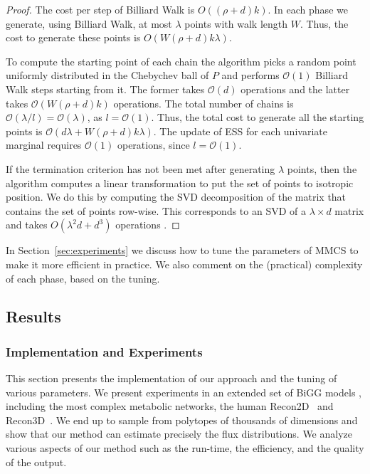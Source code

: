    \begin{proof}
       The cost per step of Billiard Walk is $O((\rho + d)k)$. In each phase we
       generate, using Billiard Walk, at most $\lambda$ points with walk length $W$.
       Thus, the cost to generate these points is $O(W(\rho + d)k\lambda)$.
     
        To compute the starting point of each chain the algorithm picks a random point
        uniformly distributed in the Chebychev ball of $P$ and performs $\mathcal{O}(1)$
        Billiard Walk steps starting from it.
        The former  takes $\mathcal{O}(d)$ operations and the latter  takes $\mathcal{O}(W(\rho + d)k)$ operations.
        The total number of chains is 
        $\mathcal{O}(\lambda / l) = \mathcal{O}(\lambda)$, 
        as $l=\mathcal{O}(1)$.
        Thus, the total cost to generate all the starting points is 
        $\mathcal{O}(d\lambda + W(\rho + d)k\lambda)$. 
        The update of ESS for each univariate marginal requires $\mathcal{O}(1)$ operations, 
        since $l = \mathcal{O}(1)$.
     
        If the termination criterion has not been met after generating $\lambda$ points,
        then the algorithm computes a linear transformation to put the set of points to isotropic position. 
        We do this by computing the SVD decomposition of the matrix that
        contains the set of points row-wise. This corresponds to an SVD of a
        $\lambda \times d$ matrix and takes $O(\lambda^2d + d^3)$ operations
        \citep{golub13}.
   \end{proof}

   In Section~\ref{sec:experiments} we discuss how to tune the parameters of MMCS
   to make it more efficient in practice. We also comment on the (practical)
   complexity of each phase, based on the tuning.



\subsection{Results}
\subsubsection*{Implementation and Experiments}
\label{sec:experiments}

   This section presents the implementation of our approach and the tuning of various parameters. 
   We present experiments in an extended set of BiGG models \citep{king2016bigg}, including the most complex metabolic networks, the human Recon2D~\citep{swainston16} and Recon3D~\citep{brunk2018recon3d}. 
   We end up to sample from polytopes of thousands of dimensions and show that our method can estimate precisely the flux distributions. 
   We analyze various aspects of our method such as the run-time, the efficiency, and the quality of the output.

